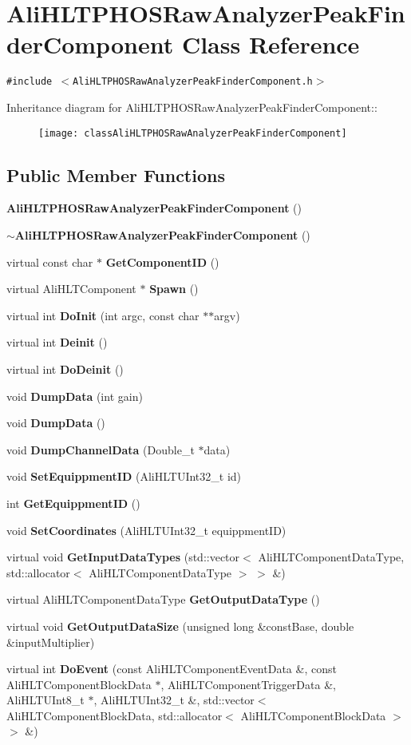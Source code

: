 \section{Ali\-HLTPHOSRaw\-Analyzer\-Peak\-Finder\-Component Class Reference}
\label{classAliHLTPHOSRawAnalyzerPeakFinderComponent}
{\tt \#include $<$Ali\-HLTPHOSRaw\-Analyzer\-Peak\-Finder\-Component.h$>$}

Inheritance diagram for Ali\-HLTPHOSRaw\-Analyzer\-Peak\-Finder\-Component::\begin{figure}[H]
\begin{center}
\leavevmode
\texttt{[image: classAliHLTPHOSRawAnalyzerPeakFinderComponent]}
\end{center}
\end{figure}
\subsection*{Public Member Functions}
\begin{CompactItemize}
\item 
{\bf Ali\-HLTPHOSRaw\-Analyzer\-Peak\-Finder\-Component} ()
\item 
{\bf $\sim$Ali\-HLTPHOSRaw\-Analyzer\-Peak\-Finder\-Component} ()
\item 
virtual const char $\ast$ {\bf Get\-Component\-ID} ()
\item 
virtual Ali\-HLTComponent $\ast$ {\bf Spawn} ()
\item 
virtual int {\bf Do\-Init} (int argc, const char $\ast$$\ast$argv)
\item 
virtual int {\bf Deinit} ()
\item 
virtual int {\bf Do\-Deinit} ()
\item 
void {\bf Dump\-Data} (int gain)
\item 
void {\bf Dump\-Data} ()
\item 
void {\bf Dump\-Channel\-Data} (Double\_\-t $\ast$data)
\item 
void {\bf Set\-Equippment\-ID} (Ali\-HLTUInt32\_\-t id)
\item 
int {\bf Get\-Equippment\-ID} ()
\item 
void {\bf Set\-Coordinates} (Ali\-HLTUInt32\_\-t equippment\-ID)
\item 
virtual void {\bf Get\-Input\-Data\-Types} (std::vector$<$ Ali\-HLTComponent\-Data\-Type, std::allocator$<$ Ali\-HLTComponent\-Data\-Type $>$ $>$ \&)
\item 
virtual Ali\-HLTComponent\-Data\-Type {\bf Get\-Output\-Data\-Type} ()
\item 
virtual void {\bf Get\-Output\-Data\-Size} (unsigned long \&const\-Base, double \&input\-Multiplier)
\item 
virtual int {\bf Do\-Event} (const Ali\-HLTComponent\-Event\-Data \&, const Ali\-HLTComponent\-Block\-Data $\ast$, Ali\-HLTComponent\-Trigger\-Data \&, Ali\-HLTUInt8\_\-t $\ast$, Ali\-HLTUInt32\_\-t \&, std::vector$<$ Ali\-HLTComponent\-Block\-Data, std::allocator$<$ Ali\-HLTComponent\-Block\-Data $>$ $>$ \&)
\end{CompactItemize}
